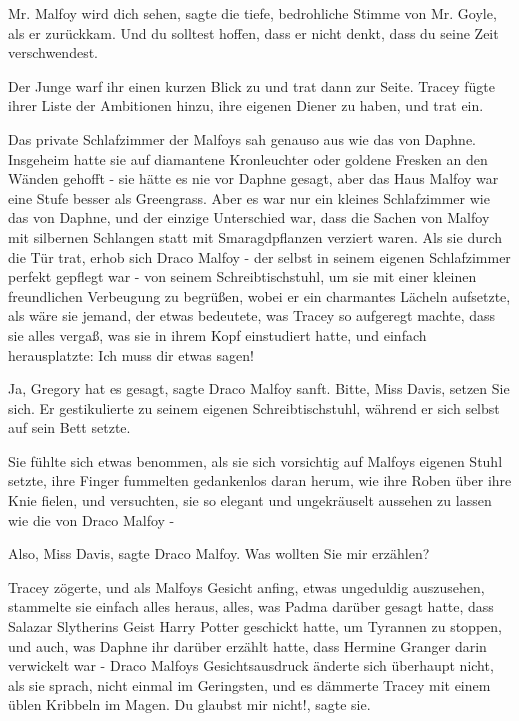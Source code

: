 \glqq Mr. Malfoy wird dich sehen\grqq{}, sagte die tiefe, bedrohliche Stimme von
Mr. Goyle, als er zurückkam. \glqq Und du solltest hoffen, dass er nicht denkt,
dass du seine Zeit verschwendest.\grqq{}

Der Junge warf ihr einen kurzen Blick zu und trat dann zur Seite. Tracey fügte
ihrer Liste der Ambitionen hinzu, ihre eigenen Diener zu haben, und trat ein.

Das private Schlafzimmer der Malfoys sah genauso aus wie das von Daphne.
Insgeheim hatte sie auf diamantene Kronleuchter oder goldene Fresken an den
Wänden gehofft - sie hätte es nie vor Daphne gesagt, aber das Haus Malfoy war
eine Stufe besser als Greengrass. Aber es war nur ein kleines Schlafzimmer wie
das von Daphne, und der einzige Unterschied war, dass die Sachen von Malfoy mit
silbernen Schlangen statt mit Smaragdpflanzen verziert waren. Als sie durch die
Tür trat, erhob sich Draco Malfoy - der selbst in seinem eigenen Schlafzimmer
perfekt gepflegt war - von seinem Schreibtischstuhl, um sie mit einer kleinen
freundlichen Verbeugung zu begrüßen, wobei er ein charmantes Lächeln aufsetzte,
als wäre sie jemand, der etwas bedeutete, was Tracey so aufgeregt machte, dass
sie alles vergaß, was sie in ihrem Kopf einstudiert hatte, und einfach
herausplatzte: \glqq Ich muss dir etwas sagen!\grqq{}

\glqq Ja, Gregory hat es gesagt\grqq{}, sagte Draco Malfoy sanft. \glqq Bitte,
Miss Davis, setzen Sie sich.\grqq{} Er gestikulierte zu seinem eigenen
Schreibtischstuhl, während er sich selbst auf sein Bett setzte.

Sie fühlte sich etwas benommen, als sie sich vorsichtig auf Malfoys eigenen
Stuhl setzte, ihre Finger fummelten gedankenlos daran herum, wie ihre Roben über
ihre Knie fielen, und versuchten, sie so elegant und ungekräuselt aussehen zu
lassen wie die von Draco Malfoy -

\glqq Also, Miss Davis\grqq{}, sagte Draco Malfoy. \glqq Was wollten Sie mir
erzählen?\grqq{}

Tracey zögerte, und als Malfoys Gesicht anfing, etwas ungeduldig auszusehen,
stammelte sie einfach alles heraus, alles, was Padma darüber gesagt hatte, dass
Salazar Slytherins Geist Harry Potter geschickt hatte, um Tyrannen zu stoppen,
und auch, was Daphne ihr darüber erzählt hatte, dass Hermine Granger darin
verwickelt war - Draco Malfoys Gesichtsausdruck änderte sich überhaupt nicht,
als sie sprach, nicht einmal im Geringsten, und es dämmerte Tracey mit einem
üblen Kribbeln im Magen. \glqq Du glaubst mir nicht!\grqq{}, sagte sie.

